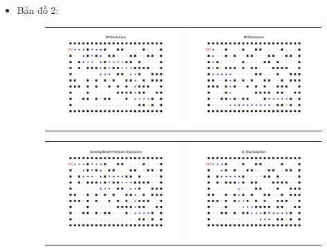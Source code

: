 \documentclass[11pt]{scrartcl} %
\begin{document}
\begin{itemize}
	\newpage
	\item Bản đồ 2:
	\begin{figure}[h] \label{bd2}
		\centering
		\begin{tabular}{cc}
			\includegraphics[width=8cm]{Figures/fg2_dfs.png} &
			\includegraphics[width=8cm]{Figures/fg2_bfs.png} \\
		\end{tabular}
	\end{figure}
	\begin{figure}[h] \label{Hình 2}
		\centering
		\begin{tabular}{cc}
			\includegraphics[width=8cm]{Figures/fg2_gbfs.png} &
			\includegraphics[width=8cm]{Figures/fg2_astar.png}

\end{tabular}
\end{figure}
\end{itemize}
\end{document}
